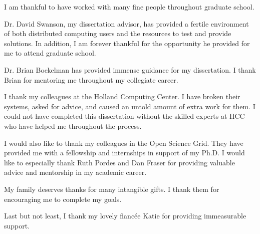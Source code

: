 \documentclass[print,phd]{nuthesis}
\begin{document}


\begin{acknowledgments}
I am thankful to have worked with many fine people throughout graduate school.

Dr. David Swanson, my dissertation advisor, has provided a fertile environment of both distributed computing users and the resources to test and provide solutions.  In addition, I am forever thankful for the opportunity he provided for me to attend graduate school.

Dr. Brian Bockelman has provided immense guidance for my dissertation.  I thank Brian for mentoring me throughout my collegiate career.

I thank my colleagues at the Holland Computing Center.  I have broken their systems, asked for advice, and caused an untold amount of extra work for them.  I could not have completed this dissertation without the skilled experts at HCC who have helped me throughout the process.

I would also like to thank my colleagues in the Open Science Grid.  They have provided me with a fellowship and internships in support of my Ph.D.  I would like to especially thank Ruth Pordes and Dan Fraser for providing valuable advice and mentorship in my academic career.

My family deserves thanks for many intangible gifts.  I thank them for encouraging me to complete my goals.

Last but not least, I thank my lovely fianc\'ee Katie for providing immeasurable support. 

\end{acknowledgments}


\tableofcontents
\listoffigures
\listoftables
\mainmatter
\end{document}
